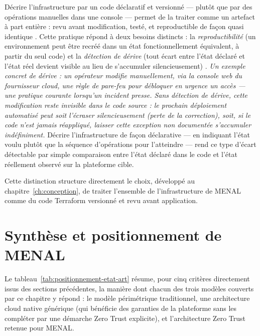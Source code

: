 Décrire l'infrastructure par un code déclaratif et versionné --- plutôt que par des
opérations manuelles dans une console --- permet de la traiter comme un artefact à part
entière : revu avant modification, testé, et reproductible de façon quasi identique
\parencite{iac_morris2020}. Cette pratique répond à deux besoins distincts : la
\emph{reproductibilité} (un environnement peut être recréé dans un état fonctionnellement
équivalent, à partir du seul code) et la \emph{détection de dérive} (tout écart entre l'état
déclaré et l'état réel devient visible au lieu de s'accumuler silencieusement)
\parencite{hashicorp_drift}. \textit{Un exemple concret de dérive : un opérateur modifie
manuellement, via la console web du fournisseur cloud, une règle de pare-feu pour débloquer en
urgence un accès --- une pratique courante lorsqu'un incident presse. Sans détection de dérive,
cette modification reste invisible dans le code source : le prochain déploiement automatisé
peut soit l'écraser silencieusement (perte de la correction), soit, si le code n'est jamais
réappliqué, laisser cette exception non documentée s'accumuler indéfiniment.} Décrire
l'infrastructure de façon déclarative --- en indiquant l'état voulu plutôt que la séquence
d'opérations pour l'atteindre --- rend ce type d'écart détectable par simple comparaison entre
l'état déclaré dans le code et l'état réellement observé sur la plateforme cible.

Cette distinction structure directement le choix, développé au
chapitre~\ref{ch:conception}, de traiter l'ensemble de l'infrastructure de MENAL comme du
code Terraform versionné et revu avant application.

\section{Synthèse et positionnement de MENAL}

Le tableau~\ref{tab:positionnement-etat-art} résume, pour cinq critères directement issus des
sections précédentes, la manière dont chacun des trois modèles couverts par ce chapitre y
répond : le modèle périmétrique traditionnel, une architecture cloud native générique (qui
bénéficie des garanties de la plateforme sans les compléter par une démarche Zero Trust
explicite), et l'architecture Zero Trust retenue pour MENAL.

